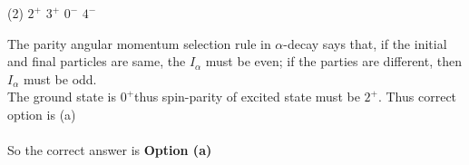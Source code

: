 \begin{enumerate}
	\begin{tasks}(2)
		\task[\textbf{a.}]$2^{+}$
		\task[\textbf{b.}]$3^{+}$
		\task[\textbf{c.}]$0^{-}$
		\task[\textbf{d.}]$4^{-}$ 
	\end{tasks}
	\begin{answer}
		The parity angular momentum selection rule in $\alpha$-decay says that, if the initial and final particles are same, the $I_\alpha$ must be even; if the parties are different, then $I_\alpha$ must be odd.\\	The ground state is $0^{+}$thus spin-parity of excited state must be $2^{+}$. Thus correct option is (a)\\\\
		So the correct answer is \textbf{Option (a)}
	\end{answer}
	
	
	
	
	
	
	
	
\end{enumerate}
